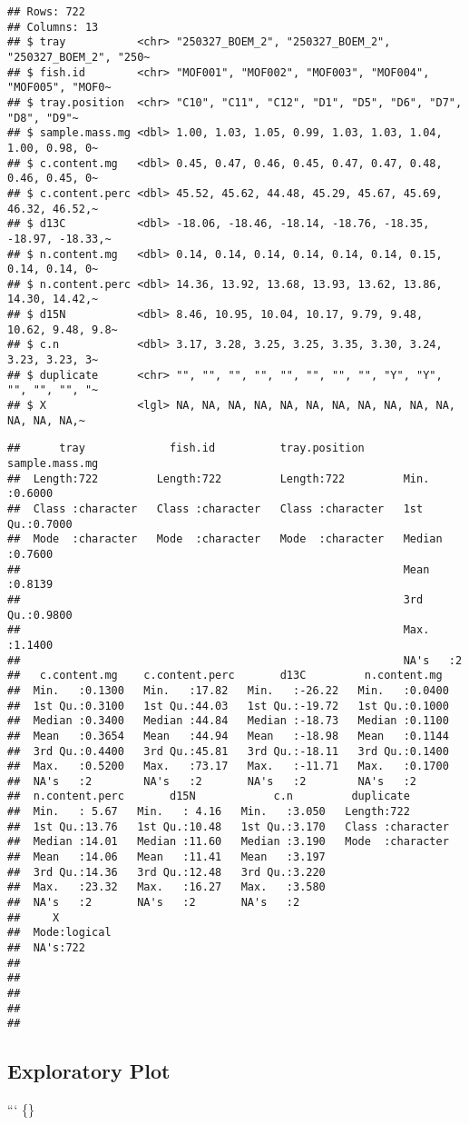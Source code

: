 \documentclass[
]{article}
\begin{document}
\begin{verbatim}
## Rows: 722
## Columns: 13
## $ tray           <chr> "250327_BOEM_2", "250327_BOEM_2", "250327_BOEM_2", "250~
## $ fish.id        <chr> "MOF001", "MOF002", "MOF003", "MOF004", "MOF005", "MOF0~
## $ tray.position  <chr> "C10", "C11", "C12", "D1", "D5", "D6", "D7", "D8", "D9"~
## $ sample.mass.mg <dbl> 1.00, 1.03, 1.05, 0.99, 1.03, 1.03, 1.04, 1.00, 0.98, 0~
## $ c.content.mg   <dbl> 0.45, 0.47, 0.46, 0.45, 0.47, 0.47, 0.48, 0.46, 0.45, 0~
## $ c.content.perc <dbl> 45.52, 45.62, 44.48, 45.29, 45.67, 45.69, 46.32, 46.52,~
## $ d13C           <dbl> -18.06, -18.46, -18.14, -18.76, -18.35, -18.97, -18.33,~
## $ n.content.mg   <dbl> 0.14, 0.14, 0.14, 0.14, 0.14, 0.14, 0.15, 0.14, 0.14, 0~
## $ n.content.perc <dbl> 14.36, 13.92, 13.68, 13.93, 13.62, 13.86, 14.30, 14.42,~
## $ d15N           <dbl> 8.46, 10.95, 10.04, 10.17, 9.79, 9.48, 10.62, 9.48, 9.8~
## $ c.n            <dbl> 3.17, 3.28, 3.25, 3.25, 3.35, 3.30, 3.24, 3.23, 3.23, 3~
## $ duplicate      <chr> "", "", "", "", "", "", "", "", "Y", "Y", "", "", "", "~
## $ X              <lgl> NA, NA, NA, NA, NA, NA, NA, NA, NA, NA, NA, NA, NA, NA,~
\end{verbatim}

\begin{verbatim}
##      tray             fish.id          tray.position      sample.mass.mg  
##  Length:722         Length:722         Length:722         Min.   :0.6000  
##  Class :character   Class :character   Class :character   1st Qu.:0.7000  
##  Mode  :character   Mode  :character   Mode  :character   Median :0.7600  
##                                                           Mean   :0.8139  
##                                                           3rd Qu.:0.9800  
##                                                           Max.   :1.1400  
##                                                           NA's   :2       
##   c.content.mg    c.content.perc       d13C         n.content.mg   
##  Min.   :0.1300   Min.   :17.82   Min.   :-26.22   Min.   :0.0400  
##  1st Qu.:0.3100   1st Qu.:44.03   1st Qu.:-19.72   1st Qu.:0.1000  
##  Median :0.3400   Median :44.84   Median :-18.73   Median :0.1100  
##  Mean   :0.3654   Mean   :44.94   Mean   :-18.98   Mean   :0.1144  
##  3rd Qu.:0.4400   3rd Qu.:45.81   3rd Qu.:-18.11   3rd Qu.:0.1400  
##  Max.   :0.5200   Max.   :73.17   Max.   :-11.71   Max.   :0.1700  
##  NA's   :2        NA's   :2       NA's   :2        NA's   :2       
##  n.content.perc       d15N            c.n         duplicate        
##  Min.   : 5.67   Min.   : 4.16   Min.   :3.050   Length:722        
##  1st Qu.:13.76   1st Qu.:10.48   1st Qu.:3.170   Class :character  
##  Median :14.01   Median :11.60   Median :3.190   Mode  :character  
##  Mean   :14.06   Mean   :11.41   Mean   :3.197                     
##  3rd Qu.:14.36   3rd Qu.:12.48   3rd Qu.:3.220                     
##  Max.   :23.32   Max.   :16.27   Max.   :3.580                     
##  NA's   :2       NA's   :2       NA's   :2                         
##     X          
##  Mode:logical  
##  NA's:722      
##                
##                
##                
##                
## 
\end{verbatim}

\subsection{Exploratory Plot}\label{exploratory-plot}

``` \{\}
\end{document}
